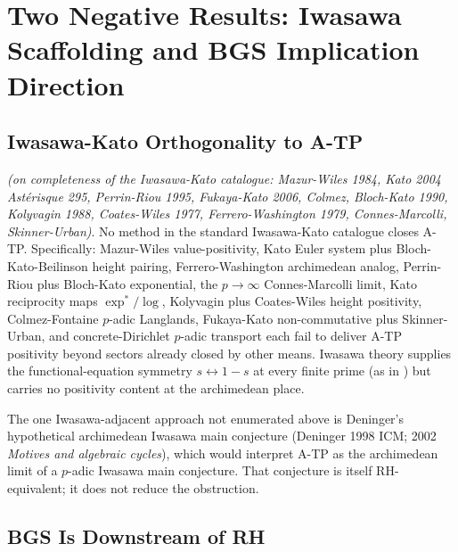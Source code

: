 \section{Two Negative Results: Iwasawa Scaffolding and BGS Implication Direction}
\label{v4-arith:w8-atp:negative}

\subsection{Iwasawa-Kato Orthogonality to A-TP}
\label{v4-arith:w8-atp:negative:iwasawa}

\begin{theorem}
\label{v4-arith:w8-atp:thm:iwasawa-scaffolding}
\ClaimStatusProvedHereConditional \emph{(on completeness of the
Iwasawa-Kato catalogue: Mazur-Wiles 1984, Kato 2004 Ast\'{e}risque 295,
Perrin-Riou 1995, Fukaya-Kato 2006, Colmez, Bloch-Kato 1990,
Kolyvagin 1988, Coates-Wiles 1977, Ferrero-Washington 1979,
Connes-Marcolli, Skinner-Urban)}.
No method in the standard Iwasawa-Kato catalogue closes A-TP.
Specifically: Mazur-Wiles value-positivity, Kato Euler system plus
Bloch-Kato-Beilinson height pairing, Ferrero-Washington archimedean
analog, Perrin-Riou plus Bloch-Kato exponential, the \(p\to\infty\)
Connes-Marcolli limit, Kato reciprocity maps \(\exp^{*}/\log\),
Kolyvagin plus Coates-Wiles height positivity, Colmez-Fontaine
\(p\)-adic Langlands, Fukaya-Kato non-commutative plus Skinner-Urban,
and concrete-Dirichlet \(p\)-adic transport each fail to deliver
A-TP positivity beyond sectors already closed by other means.
Iwasawa theory supplies the functional-equation symmetry
\(s\leftrightarrow 1-s\) at every finite prime
(as in ) but carries no positivity
content at the archimedean place.
\end{theorem}

\begin{remark}
\label{v4-arith:w8-atp:rem:deninger-archimedean}
The one Iwasawa-adjacent approach not enumerated above is
Deninger's hypothetical archimedean Iwasawa main conjecture
(Deninger 1998 ICM; 2002 \emph{Motives and algebraic cycles}), which
would interpret A-TP as the archimedean limit of a \(p\)-adic Iwasawa
main conjecture. That conjecture is itself RH-equivalent; it does not
reduce the obstruction.
\end{remark}

\subsection{BGS Is Downstream of RH}
\label{v4-arith:w8-atp:negative:BGS}

